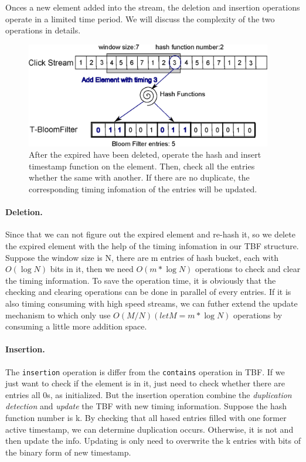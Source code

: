 \documentclass[runningheads,report]{llncs}
\begin{document}
Onces a new element added into the stream, the deletion and insertion operations operate in a limited time period. We will discuss the complexity of the two operations in details.

\begin{figure}
\centering
\includegraphics[height=4.6cm]{pic/add}
\caption{After the expired have been deleted, operate the hash and insert timestamp function on the element. Then, check all the entries whether the same with another. If there are no duplicate, the corresponding timing infomation of the entries will be updated.}
\label{fig:add}
\end{figure}

\paragraph{Deletion.}

Since that we can not figure out the expired element and re-hash it, so we delete the expired element with the help of the timing infomation in our TBF structure. Suppose the window size is N, there are m entries of hash bucket, each with $O(\log N)$ bits in it, then we need $O(m*\log N)$ operations to check and clear the timing information. To save the operation time, it is obviously that the checking and clearing operations can be done in parallel of every entries. If it is also timing consuming with high speed streams, we can futher extend the update mechanism to which only use $O(M/N)(let M=m*\log N)$ operations by consuming a little more addition space.


\paragraph{Insertion.}
The \texttt{insertion} operation is differ from the \texttt{contains} operation in TBF. If we just want to check if the element is in it, just need to check whether there are entries all 0s, as initialized. But the insertion operation combine the \textit{duplication detection} and \textit{update} the TBF with new timing information.  Suppose the hash function number is k. By checking that all hased entries filled with one former active timestamp, we can determine duplication occurs. Otherwise, it is not and then update the info. Updating is only need to overwrite the k entries with bits of the binary form of new timestamp.
\end{document}

